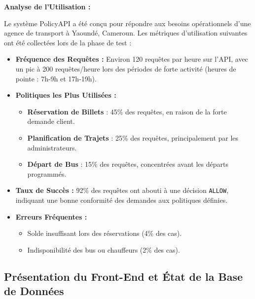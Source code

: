 \documentclass[12pt,a4paper]{article}
\begin{document}
    \begin{resultbox}
        \textbf{Analyse de l'Utilisation :}

        Le système PolicyAPI a été conçu pour répondre aux besoins opérationnels d'une agence de transport à Yaoundé, Cameroun. Les métriques d'utilisation suivantes ont été collectées lors de la phase de test :

        \begin{itemize}
            \item \textbf{Fréquence des Requêtes :} Environ 120 requêtes par heure sur l'API, avec un pic à 200 requêtes/heure lors des périodes de forte activité (heures de pointe : 7h-9h et 17h-19h).
            \item \textbf{Politiques les Plus Utilisées :}
            \begin{itemize}
                \item \textbf{Réservation de Billets} : 45\% des requêtes, en raison de la forte demande client.
                \item \textbf{Planification de Trajets} : 25\% des requêtes, principalement par les administrateurs.
                \item \textbf{Départ de Bus} : 15\% des requêtes, concentrées avant les départs programmés.
            \end{itemize}
            \item \textbf{Taux de Succès :} 92\% des requêtes ont abouti à une décision \texttt{ALLOW}, indiquant une bonne conformité des demandes aux politiques définies.
            \item \textbf{Erreurs Fréquentes :}
            \begin{itemize}
                \item Solde insuffisant lors des réservations (4\% des cas).
                \item Indisponibilité des bus ou chauffeurs (2\% des cas).
            \end{itemize}
        \end{itemize}
    \end{resultbox}

    \subsection{Présentation du Front-End et État de la Base de Données}
\end{document}
